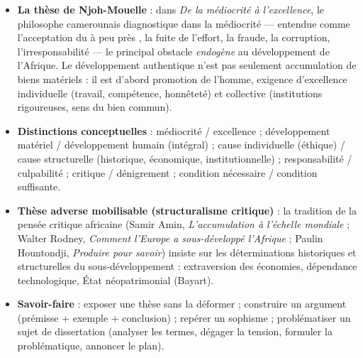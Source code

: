 \documentclass[11pt]{article}
\begin{document}
\begin{aretenir}
\begin{itemize}
\item \textbf{La thèse de Njoh-Mouelle} : dans \emph{De la médiocrité à l'excellence}, le philosophe camerounais diagnostique dans la médiocrité — entendue comme l'acceptation du \guillemotleft à peu près \guillemotright, la fuite de l'effort, la fraude, la corruption, l'irresponsabilité — le principal obstacle \emph{endogène} au développement de l'Afrique. Le développement authentique n'est pas seulement accumulation de biens matériels : il est d'abord promotion de l'homme, exigence d'excellence individuelle (travail, compétence, honnêteté) et collective (institutions rigoureuses, sens du bien commun).
\item \textbf{Distinctions conceptuelles} : médiocrité / excellence ; développement matériel / développement humain (intégral) ; cause individuelle (éthique) / cause structurelle (historique, économique, institutionnelle) ; responsabilité / culpabilité ; critique / dénigrement ; condition nécessaire / condition suffisante.
\item \textbf{Thèse adverse mobilisable (structuralisme critique)} : la tradition de la pensée critique africaine (Samir Amin, \emph{L'accumulation à l'échelle mondiale} ; Walter Rodney, \emph{Comment l'Europe a sous-développé l'Afrique} ; Paulin Hountondji, \emph{Produire pour savoir}) insiste sur les déterminations historiques et structurelles du sous-développement : extraversion des économies, dépendance technologique, État néopatrimonial (Bayart).
\item \textbf{Savoir-faire} : exposer une thèse sans la déformer ; construire un argument (prémisse + exemple + conclusion) ; repérer un sophisme ; problématiser un sujet de dissertation (analyser les termes, dégager la tension, formuler la problématique, annoncer le plan).
\end{itemize}
\end{aretenir}
\end{document}
